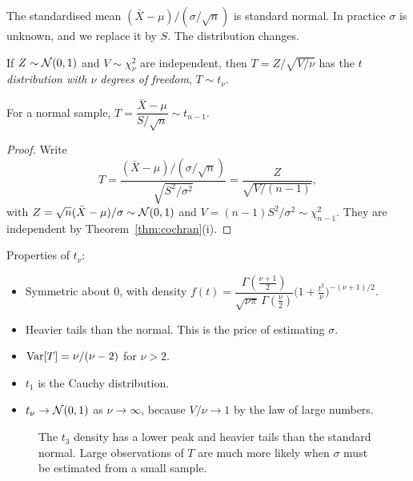 The standardised mean $(\bar{X}-\mu)/(\sigma/\sqrt n)$ is standard normal. In practice $\sigma$ is unknown, and we replace it by $S$. The distribution changes.

\begin{definition}
If $Z\sim\mathcal{N}(0,1)$ and $V\sim\chi^2_\nu$ are independent, then $T=Z/\sqrt{V/\nu}$ has the \emph{$t$ distribution with $\nu$ degrees of freedom}, $T\sim t_\nu$.
\end{definition}

\begin{theorem}\label{thm:tstat}
For a normal sample, $T=\dfrac{\bar{X}-\mu}{S/\sqrt n}\sim t_{n-1}$.
\end{theorem}

\begin{proof}
Write
\[ T=\dfrac{(\bar{X}-\mu)/(\sigma/\sqrt n)}{\sqrt{S^2/\sigma^2}}=\dfrac{Z}{\sqrt{V/(n-1)}}, \]
with $Z=\sqrt n(\bar{X}-\mu)/\sigma\sim\mathcal{N}(0,1)$ and $V=(n-1)S^2/\sigma^2\sim\chi^2_{n-1}$. They are independent by Theorem~\ref{thm:cochran}(i).
\end{proof}

Properties of $t_\nu$:
\begin{itemize}
  \item Symmetric about $0$, with density $f(t)=\dfrac{\Gamma(\frac{\nu+1}2)}{\sqrt{\nu\pi}\,\Gamma(\frac\nu2)}\big(1+\tfrac{t^2}\nu\big)^{-(\nu+1)/2}$.
  \item Heavier tails than the normal. This is the price of estimating $\sigma$.
  \item $\operatorname{Var}[T]=\nu/(\nu-2)$ for $\nu>2$.
  \item $t_1$ is the Cauchy distribution.
  \item $t_\nu\to\mathcal{N}(0,1)$ as $\nu\to\infty$, because $V/\nu\to1$ by the law of large numbers.
\end{itemize}

\begin{figure}[h]
\centering
{}
\caption{The $t_3$ density has a lower peak and heavier tails than the standard normal. Large observations of $T$ are much more likely when $\sigma$ must be estimated from a small sample.}
\end{figure}

